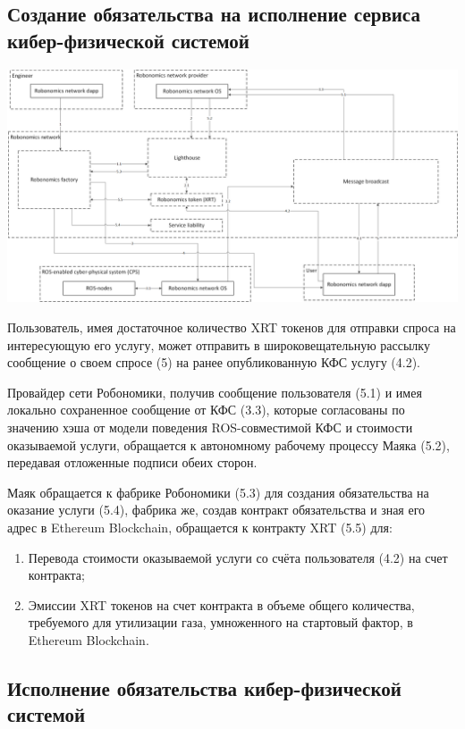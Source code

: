 \documentclass{article}
\begin{document}
\subsection{Создание обязательства на исполнение сервиса кибер-физической системой}

\includegraphics[width=1\textwidth]{step-by-step-5.png} 

Пользователь, имея достаточное количество XRT токенов для отправки спроса на интересующую его услугу, может отправить в широковещательную рассылку сообщение о своем спросе (5) на ранее опубликованную КФС услугу (4.2).

Провайдер сети Робономики, получив сообщение пользователя (5.1) и имея локально сохраненное сообщение от КФС (3.3), которые согласованы по значению хэша от модели поведения ROS-совместимой КФС и стоимости оказываемой услуги, обращается к автономному рабочему процессу Маяка (5.2), передавая отложенные подписи обеих сторон.

Маяк обращается к фабрике Робономики (5.3) для создания обязательства на оказание услуги (5.4), фабрика же, создав контракт обязательства и зная его адрес в Ethereum Blockchain, обращается к контракту XRT (5.5) для:
\begin{enumerate}
	\item Перевода стоимости оказываемой услуги со счёта пользователя (4.2) на счет контракта;
	\item Эмиссии XRT токенов на счет контракта в объеме общего количества, требуемого для утилизации газа, умноженного на стартовый фактор, в Ethereum Blockchain.
\end{enumerate}

\subsection{Исполнение обязательства кибер-физической системой}
\end{document}
